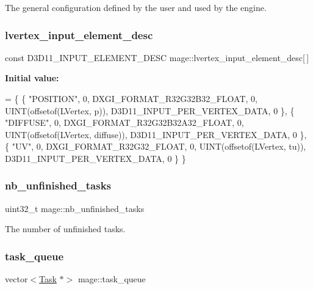 The general configuration defined by the user and used by the engine. \hypertarget{namespacemage_ae6b56f20c8e8917ef1be8d9e4cef3ea3}{}\label{namespacemage_ae6b56f20c8e8917ef1be8d9e4cef3ea3} 
\subsubsection{\texorpdfstring{lvertex\+\_\+input\+\_\+element\+\_\+desc}{lvertex\_input\_element\_desc}}
{\footnotesize\ttfamily const D3\+D11\+\_\+\+I\+N\+P\+U\+T\+\_\+\+E\+L\+E\+M\+E\+N\+T\+\_\+\+D\+E\+SC mage\+::lvertex\+\_\+input\+\_\+element\+\_\+desc\mbox{[}$\,$\mbox{]}}

{\bfseries Initial value\+:}
\begin{DoxyCode}
= \{
        \{ \textcolor{stringliteral}{"POSITION"}, 0, DXGI\_FORMAT\_R32G32B32\_FLOAT, 0, UINT(offsetof(LVertex, p)), 
      D3D11\_INPUT\_PER\_VERTEX\_DATA, 0 \},
        \{ \textcolor{stringliteral}{"DIFFUSE"}, 0, DXGI\_FORMAT\_R32G32B32A32\_FLOAT, 0, UINT(offsetof(LVertex, diffuse)), 
      D3D11\_INPUT\_PER\_VERTEX\_DATA, 0 \},
        \{ \textcolor{stringliteral}{"UV"}, 0, DXGI\_FORMAT\_R32G32\_FLOAT, 0, UINT(offsetof(LVertex, tu)), D3D11\_INPUT\_PER\_VERTEX\_DATA, 0
       \}
    \}
\end{DoxyCode}
\hypertarget{namespacemage_a390e8652d67667609daf3aa64e3c00a8}{}\label{namespacemage_a390e8652d67667609daf3aa64e3c00a8} 
\subsubsection{\texorpdfstring{nb\+\_\+unfinished\+\_\+tasks}{nb\_unfinished\_tasks}}
{\footnotesize\ttfamily uint32\+\_\+t mage\+::nb\+\_\+unfinished\+\_\+tasks\hspace{0.3cm}{\ttfamily [static]}}

The number of unfinished tasks. \hypertarget{namespacemage_af4824558d428695e4661c5e7cdfa4419}{}\label{namespacemage_af4824558d428695e4661c5e7cdfa4419} 
\subsubsection{\texorpdfstring{task\+\_\+queue}{task\_queue}}
{\footnotesize\ttfamily vector$<$\hyperlink{classmage_1_1_task}{Task} $\ast$$>$ mage\+::task\+\_\+queue\hspace{0.3cm}{\ttfamily [static]}}

